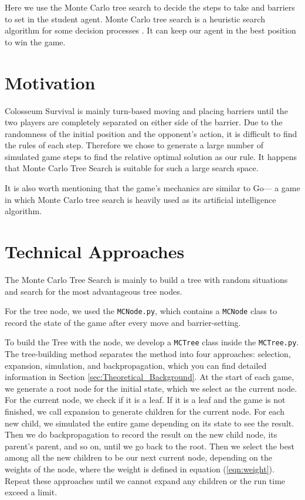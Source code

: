 \documentclass[twoside,11pt]{article}
\begin{document}
Here we use the Monte Carlo tree search to decide the steps to take and barriers to set in the student agent. Monte Carlo tree search is a heuristic search algorithm for some decision processes \cite{2016Natur}. It can keep our agent in the best position to win the game.

\section{Motivation}
Colosseum Survival is mainly turn-based moving and placing barriers until the two players are completely separated on either side of the barrier. Due to the randomness of the initial position and the opponent's action, it is difficult to find the rules of each step. Therefore we chose to generate a large number of simulated game steps to find the relative optimal solution as our rule. It happens that Monte Carlo Tree Search is suitable for such a large search space.

It is also worth mentioning that the game's mechanics are similar to Go--- a game in which Monte Carlo tree search is heavily used as its artificial intelligence algorithm.\cite{mctsGo2008}

\section{Technical Approaches}
The Monte Carlo Tree Search is mainly to build a tree with random situations and search for the most advantageous tree nodes. 

For the tree node, we used the \texttt{MCNode.py}, which contains a \texttt{MCNode} class to record the state of the game after every move and barrier-setting. 

To build the Tree with the node, we develop a \texttt{MCTree} class inside the \texttt{MCTree.py}. The tree-building method separates the method into four approaches: selection, expansion, simulation, and backpropagation, which you can find detailed information in Section \ref{sec:Theoretical_Background}.
At the start of each game, we generate a root node for the initial state, which we select as the current node. For the current node, we check if it is a leaf. If it is a leaf and the game is not finished, we call expansion to generate children for the current node. For each new child, we simulated the entire game depending on its state to see the result. Then we do backpropagation to record the result on the new child node, its parent's parent, and so on, until we go back to the root. Then we select the best among all the new children to be our next current node, depending on the weights of the node, where the weight is defined in equation (\ref{eqn:weight}). Repeat these approaches until we cannot expand any children or the run time exceed a limit.
\end{document}

